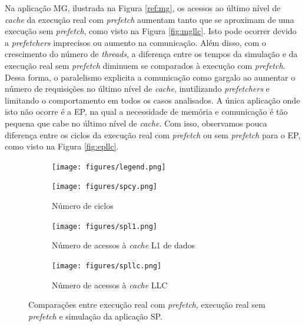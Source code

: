 \documentclass[12pt]{article}
\begin{document}
\vspace{-2mm}
Na aplicação MG, ilustrada na Figura \ref{ref:mg}, os acessos ao último nível de \textit{cache} da execução real com \textit{prefetch} aumentam tanto que se aproximam de uma execução sem \textit{prefetch}, como visto na Figura \ref{fig:mgllc}. 
Isto pode ocorrer devido a \textit{prefetchers} imprecisos ou aumento na comunicação.
Além disso, com o crescimento do número de \mbox{\emph{threads}}, a diferença entre os tempos da simulação e da execução real sem \textit{prefetch} diminuem se comparados à execução com \textit{prefetch}.
Dessa forma, o paralelismo explicita a comunicação como gargalo ao aumentar o número de requisições no último nível de \emph{cache}, inutilizando \textit{prefetchers} e limitando o comportamento em todos os casos analisados.
A única aplicação onde isto não ocorre é a EP, na qual a necessidade de memória e comunicação é tão pequena que cabe no último nível de \textit{cache}.
Com isso, observamos pouca diferença entre os ciclos da execução real com \textit{prefetch} ou sem \textit{prefetch} para o EP, como visto na Figura \ref{fig:epllc}.


\iffalse %
\begin{figure}[b!]
  \hspace{+25mm}
  \begin{subfigure}{0.33\textwidth}
    \centering
        \texttt{[image: figures/legend.png]}
    \label{fig:spleg}
  \end{subfigure}
  \vspace{-5mm}

  \begin{subfigure}{0.33\textwidth}
    \centering
    \vspace{-4mm}
        \texttt{[image: figures/spcy.png]}
    \caption{Número de ciclos}
    \label{fig:spcycles}
  \end{subfigure}%
  \begin{subfigure}{0.33\textwidth}
    \centering	
        \texttt{[image: figures/spl1.png]}
    \caption{Número de acessos à \textit{cache} L1 de dados}
    \label{fig:spl1}
  \end{subfigure}%
  \begin{subfigure}{0.33\textwidth}
    \centering	
        \texttt{[image: figures/spllc.png]}
    \caption{Número de acessos à \textit{cache} LLC}
    \label{fig:spllc}
  \end{subfigure}
  
  \caption{Comparações entre execução real com \textit{prefetch}, execução real sem \textit{prefetch} e simulação da aplicação SP.}
  \label{ref:sp}
\end{figure}
\end{document}
